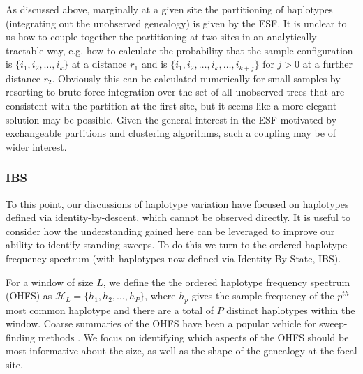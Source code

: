 \documentclass[a4paper,10pt]{article}
\begin{document}
As discussed above, marginally at a given site the partitioning of haplotypes (integrating out the unobserved genealogy) is given by the ESF. It is unclear to us how to couple together the partitioning at two sites in an analytically tractable way, e.g. how to calculate the probability that the sample configuration is $\{i_1,i_2,\dots,i_k\}$ at a distance $r_1$ and is $\{i_1,i_2,\dots,i_k,\dots,i_{k+j}\}$ for $j>0$ at a further distance $r_2$. Obviously this can be calculated numerically for small samples by resorting to brute force integration over the set of all unobserved trees that are consistent with the partition at the first site, but it seems like a more elegant solution may be possible. Given the general interest in the ESF motivated by exchangeable partitions and clustering algorithms, such a coupling may be of wider interest.
 
\subsubsection*{IBS}
To this point, our discussions of haplotype variation have focused on haplotypes defined via identity-by-descent, which cannot be observed directly. It is useful to consider how the understanding gained here can be leveraged to improve our ability to identify standing sweeps. To do this we turn to the ordered haplotype frequency spectrum (with haplotypes now defined via Identity By State, IBS).




For a window of size $L$, we define the the ordered haplotype frequency spectrum (OHFS) as $\mathcal{H}_L = \{h_1,h_2,\dots,h_{P}\}$, where $h_p$ gives the sample frequency of the $p^{th}$ most common haplotype and there are a total of $P$ distinct haplotypes within the window. Coarse summaries of the OHFS have been a popular vehicle for sweep-finding methods \cite[e.g. EHH, iHS and H12:][]{Sabeti:2002ge,Voight:2006go,Garud:2015jy}. We focus on identifying which aspects of the OHFS should be most informative about the size, as well as the shape of the genealogy at the focal site.
\end{document}
